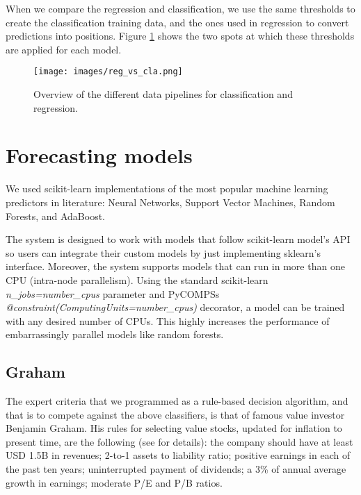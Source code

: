When we compare the regression and classification, we use the same thresholds to create the classification training data, and the ones used in regression to convert predictions into positions. Figure \ref{fig:regcla} shows the two spots at which these thresholds are applied for each model. 

\begin{figure}[ht!]
    \centering
    \texttt{[image: images/reg\_vs\_cla.png]}
    \caption{Overview of the different data pipelines for classification and regression.} 
    \label{fig:regcla}
\end{figure}

\section{Forecasting models}

We used scikit-learn \cite{scikit-learn} implementations of the most popular machine learning predictors in literature: Neural Networks, Support Vector Machines, Random Forests, and AdaBoost.

The system is designed to work with models that follow scikit-learn model's API~\cite{sklearn_api} so users can integrate their custom models by just implementing sklearn's interface. 
Moreover, the system supports models that can run in more than one CPU (intra-node parallelism). Using the standard scikit-learn \textit{n\_jobs=number\_cpus} parameter and PyCOMPSs \textit{@constraint(ComputingUnits=number\_cpus)} decorator, a model can be trained with any desired number of CPUs. This highly increases the performance of embarrassingly parallel models like random forests.

\subsection{Graham}
The expert criteria that we programmed as a rule-based decision algorithm, and that is to compete against the above classifiers, is that of famous value investor Benjamin Graham. His rules for selecting value stocks, updated for inflation to present time,  are the following (see \cite[S. 6.2]{AA14} for details):
the company should have at least USD 1.5B in revenues; 2-to-1 assets to liability ratio; positive earnings in each of the past ten years; uninterrupted payment of dividends; a 3\% of annual average growth in earnings;
moderate P/E and P/B ratios. %


